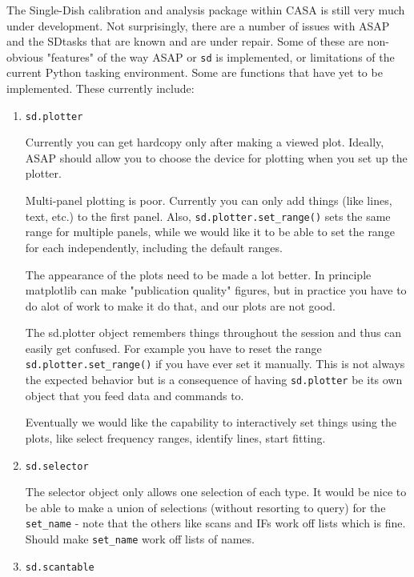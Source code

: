 The Single-Dish calibration and analysis package within CASA is still
very much under development.  Not surprisingly,
there are a number of issues with ASAP and the SDtasks that are known and
are under repair.  Some of these are non-obvious "features" of the way
ASAP or {\tt sd} is implemented, or limitations of the current Python
tasking environment.  Some are functions that have yet to be
implemented.  These currently include: 

\begin{enumerate}

\item {\tt sd.plotter}

  Currently you can get hardcopy only after making a viewed plot.
  Ideally, ASAP should allow you to choose the device for plotting
  when you set up the plotter.

  Multi-panel plotting is poor.  Currently you can only add things
  (like lines, text, etc.) to the first panel.  Also,
  {\tt sd.plotter.set\_range()} sets the same range for multiple panels,
  while we would like it to be able to set the range for each independently,
  including the default ranges.

  The appearance of the plots need to be made a lot better.  In
  principle matplotlib can make "publication quality" figures, but in
  practice you have to do alot of work to make it do that, and our plots 
  are not good.

  The sd.plotter object remembers things throughout the session
  and thus can easily get confused.  For example you have to
  reset the range {\tt sd.plotter.set\_range()} if you have ever set it
  manually.  This is not always the expected behavior but is a consequence
  of having {\tt sd.plotter} be its own object that you feed data and
  commands to.

  Eventually we would like the capability to interactively set things
  using the plots, like select frequency ranges, identify lines,
  start fitting.

\item {\tt sd.selector}

  The selector object only allows one selection of each type.  It would be 
  nice to be able to make a union of selections (without resorting to query)
  for the {\tt set\_name} - note that the others like scans and IFs work off
  lists which is fine.  Should make {\tt set\_name} work off lists of names.

\item {\tt sd.scantable}


\end{enumerate}
